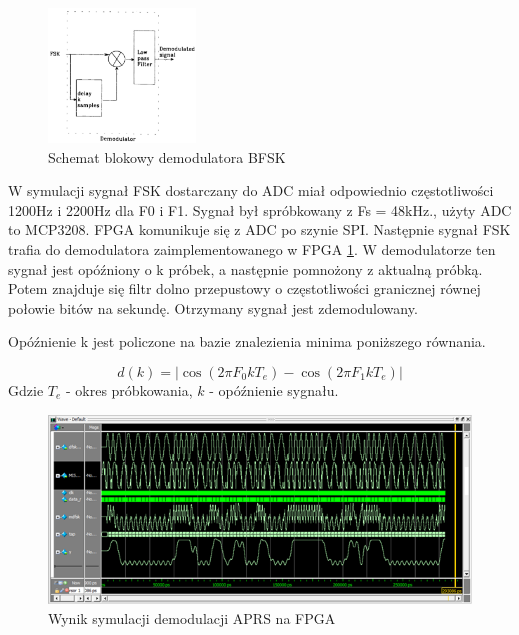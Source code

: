 \begin{figure}[!htbp]
 \includegraphics[width=0.35\textwidth]{bfsk_demodulator}
 \centering
 \caption{Schemat blokowy demodulatora BFSK}
 \label{bfsk_demodulator}
\end{figure}


W symulacji sygnał FSK dostarczany do ADC miał odpowiednio częstotliwości 1200Hz i 2200Hz dla F0 i F1.  Sygnał był spróbkowany z Fs = 48kHz., użyty ADC to MCP3208. FPGA komunikuje się z ADC po szynie SPI. Następnie sygnał FSK trafia do demodulatora zaimplementowanego w FPGA \ref{bfsk_demodulator}.  W demodulatorze ten sygnał jest opóźniony o k próbek, a następnie pomnożony z aktualną próbką. Potem znajduje się filtr dolno przepustowy o częstotliwości granicznej równej połowie bitów na sekundę. Otrzymany sygnał jest zdemodulowany.

Opóźnienie k jest policzone na bazie znalezienia minima poniższego równania.

\begin{equation}
d(k) = |\cos(2\pi F_0 k T_e) - \cos(2\pi F_1 k T_e) |
\end{equation}
Gdzie {$T_e$ - okres próbkowania, $k$ - opóźnienie sygnału}.

\begin{figure}[!htbp]
 \includegraphics[width=\textwidth]{symulacja}
 \centering
 \caption{Wynik symulacji demodulacji APRS na FPGA}
 \label{fpga}
\end{figure}


